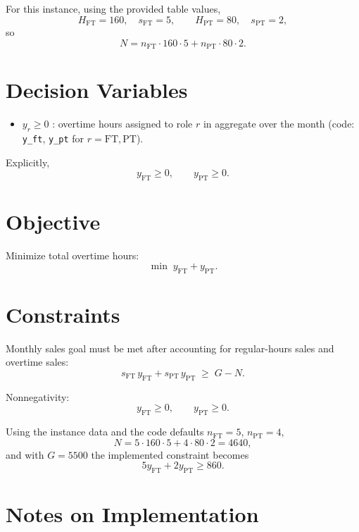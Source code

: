 For this instance, using the provided table values,
\[
H_{\mathrm{FT}}=160,\quad s_{\mathrm{FT}}=5,\qquad
H_{\mathrm{PT}}=80,\quad s_{\mathrm{PT}}=2,
\]
so
\[
N=n_{\mathrm{FT}} \cdot 160 \cdot 5 + n_{\mathrm{PT}} \cdot 80 \cdot 2.
\]

\section*{Decision Variables}

\begin{itemize}
    \item $y_r \ge 0$ : overtime hours assigned to role $r$ in aggregate over the month (code: \texttt{y\_ft}, \texttt{y\_pt} for $r=\mathrm{FT},\mathrm{PT}$).
\end{itemize}

Explicitly,
\[
y_{\mathrm{FT}} \ge 0,\qquad y_{\mathrm{PT}} \ge 0.
\]

\section*{Objective}

Minimize total overtime hours:
\[
\min \; y_{\mathrm{FT}} + y_{\mathrm{PT}}.
\]

\section*{Constraints}

Monthly sales goal must be met after accounting for regular-hours sales and overtime sales:
\[
s_{\mathrm{FT}}\, y_{\mathrm{FT}} + s_{\mathrm{PT}}\, y_{\mathrm{PT}} \;\ge\; G - N.
\]

Nonnegativity:
\[
y_{\mathrm{FT}} \ge 0,\qquad y_{\mathrm{PT}} \ge 0.
\]

Using the instance data and the code defaults $n_{\mathrm{FT}}=5$, $n_{\mathrm{PT}}=4$,
\[
N=5\cdot160\cdot5+4\cdot80\cdot2=4640,
\]
and with $G=5500$ the implemented constraint becomes
\[
5y_{\mathrm{FT}}+2y_{\mathrm{PT}} \ge 860.
\]

\section*{Notes on Implementation}


